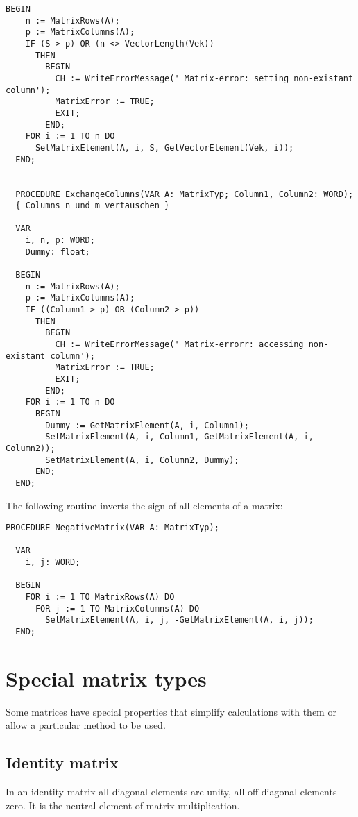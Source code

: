 \begin{refsection}
\begin{lstlisting}[caption=Column operations]
  BEGIN
    n := MatrixRows(A);
    p := MatrixColumns(A);
    IF (S > p) OR (n <> VectorLength(Vek))
      THEN
        BEGIN
          CH := WriteErrorMessage(' Matrix-error: setting non-existant column');
          MatrixError := TRUE;
          EXIT;
        END;
    FOR i := 1 TO n DO
      SetMatrixElement(A, i, S, GetVectorElement(Vek, i));
  END;


  PROCEDURE ExchangeColumns(VAR A: MatrixTyp; Column1, Column2: WORD);
  { Columns n und m vertauschen }

  VAR
    i, n, p: WORD;
    Dummy: float;

  BEGIN
    n := MatrixRows(A);
    p := MatrixColumns(A);
    IF ((Column1 > p) OR (Column2 > p))
      THEN
        BEGIN
          CH := WriteErrorMessage(' Matrix-errorr: accessing non-existant column');
          MatrixError := TRUE;
          EXIT;
        END;
    FOR i := 1 TO n DO
      BEGIN
        Dummy := GetMatrixElement(A, i, Column1);
        SetMatrixElement(A, i, Column1, GetMatrixElement(A, i, Column2));
        SetMatrixElement(A, i, Column2, Dummy);
      END;
  END;
\end{lstlisting}

The following routine inverts the sign of all elements of a matrix:

\begin{lstlisting}[caption=invert sign of all matrix elements]
  PROCEDURE NegativeMatrix(VAR A: MatrixTyp);

  VAR
    i, j: WORD;

  BEGIN
    FOR i := 1 TO MatrixRows(A) DO
      FOR j := 1 TO MatrixColumns(A) DO
        SetMatrixElement(A, i, j, -GetMatrixElement(A, i, j));
  END;
\end{lstlisting}


\section{Special matrix types}

Some matrices have special properties that simplify calculations with them or allow a particular method to be used.

\subsection{Identity matrix}

In an identity matrix all diagonal elements are unity, all off-diagonal elements zero. It is the neutral element of matrix multiplication.


\end{refsection}
